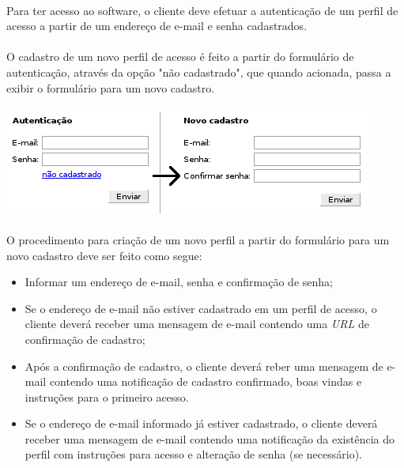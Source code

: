 \documentclass[a4paper,12pt]{article}
\begin{document}
\paragraph{}
Para ter acesso ao software, o cliente deve efetuar a autenticação de um perfil de acesso a partir de um endereço de e-mail e senha cadastrados.
\paragraph{}
O cadastro de um novo perfil de acesso é feito a partir do formulário de autenticação, através da opção "não cadastrado", que quando acionada, passa a exibir o formulário para um novo cadastro. 
\paragraph{}
\begin{center}
\includegraphics[scale=0.8]{authform.png}
\end{center}
\paragraph{}
O procedimento para criação de um novo perfil a partir do formulário para um novo cadastro deve ser feito como segue:
\begin{itemize}
\item Informar um endereço de e-mail, senha e confirmação de senha;
\item Se o endereço de e-mail não estiver cadastrado em um perfil de acesso, o cliente deverá receber uma mensagem de e-mail contendo uma \emph{URL} de confirmação de cadastro;
\item Após a confirmação de cadastro, o cliente deverá reber uma mensagem de e-mail contendo uma notificação de cadastro confirmado, boas vindas e instruções para o primeiro acesso.
\item Se o endereço de e-mail informado já estiver cadastrado, o cliente deverá receber uma mensagem de e-mail contendo uma notificação da existência do perfil com instruções para acesso e alteração de senha (se necessário).
\end{itemize}
\end{document}
